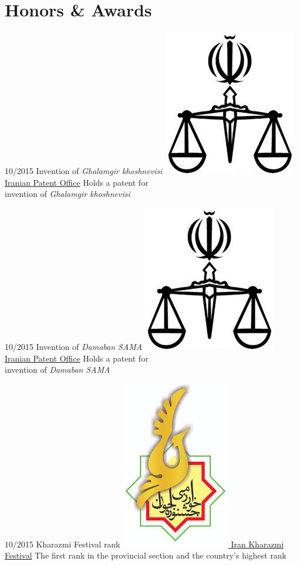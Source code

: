 \documentclass[a4paper]{friggeri-cv}
\begin{document}

\section{Honors \& Awards}
\begin{entrylist}

      \entry
    {10/2015}
    {   Invention of \emph{Ghalamgir khoshnevisi}}
    {\href{http://iripo.ssaa.ir/}{\includegraphics[scale=0.06]{img/Ghovveh_logo.jpg} Iranian Patent Office}}
    {Holds a patent for\\
    invention of \emph{Ghalamgir khoshnevisi}}

          \entry
    {10/2015}
    {   Invention of \emph{Damaban SAMA}}
    {\href{http://iripo.ssaa.ir/}{\includegraphics[scale=0.06]{img/Ghovveh_logo.jpg} Iranian Patent Office}}
    {Holds a patent for \\
    invention of \emph{Damaban SAMA}}

              \entry
    {10/2015}
    {   Kharazmi Festival rank}
    {\href{http://kharazmi.medu.ir/fa/}{\includegraphics[scale=0.06]{img/YKharazmi_logo.jpg} Iran Kharazmi Festival}}
    {The first rank in the provincial section and the country's highest rank}

\end{entrylist}
\end{document}
